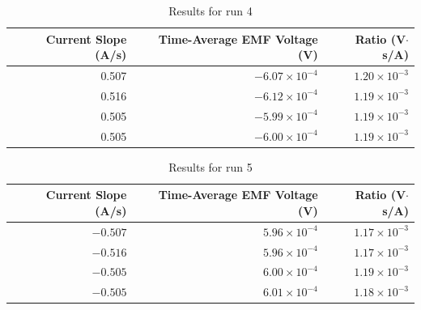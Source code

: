 \begin{table}[ht]
	\centering
	\begin{tabular}{|r|r|r|}
		\hline
		Current Slope (A/s) & Time-Average EMF Voltage (V) & Ratio (V$\cdot$s/A) \\
		\hline
		0.507 & $-6.07 \times 10^{-4}$ & $1.20 \times 10^{-3}$ \\
		0.516 & $-6.12 \times 10^{-4}$ & $1.19 \times 10^{-3}$ \\
		0.505 & $-5.99 \times 10^{-4}$ & $1.19 \times 10^{-3}$ \\
		0.505 & $-6.00 \times 10^{-4}$ & $1.19 \times 10^{-3}$ \\
		\hline
	\end{tabular}
	\caption{Results for run 4}
	\label{table.04.run.4}
\end{table}
\begin{table}[ht]
	\centering
	\begin{tabular}{|r|r|r|}
		\hline
		Current Slope (A/s) & Time-Average EMF Voltage (V) & Ratio (V$\cdot$s/A) \\
		\hline
		$-0.507$ & $5.96 \times 10^{-4}$ & $1.17 \times 10^{-3}$ \\
		$-0.516$ & $5.96 \times 10^{-4}$ & $1.17 \times 10^{-3}$ \\
		$-0.505$ & $6.00 \times 10^{-4}$ & $1.19 \times 10^{-3}$ \\
		$-0.505$ & $6.01 \times 10^{-4}$ & $1.18 \times 10^{-3}$ \\
		\hline
	\end{tabular}
	\caption{Results for run 5}
	\label{table.04.run.5}
\end{table}
\FloatBarrier
\newpage
